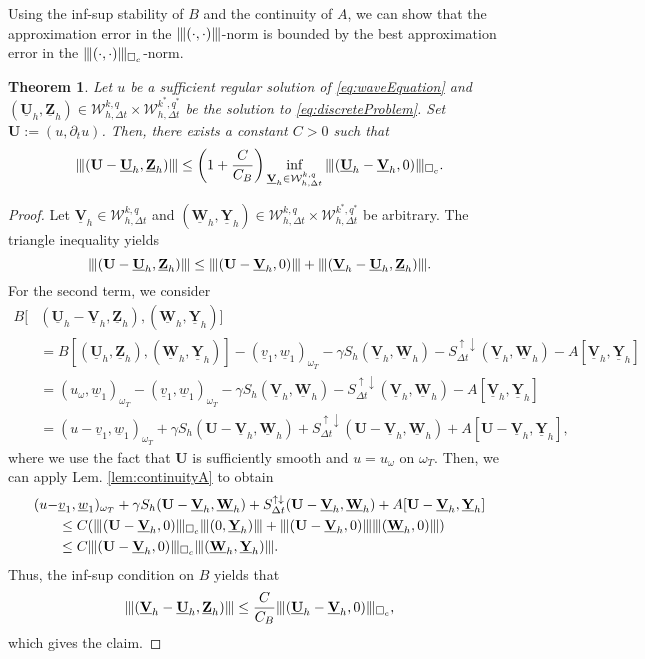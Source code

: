 \documentclass[sn-mathphys-num]{sn-jnl}
\newtheorem{thm}{Theorem}[section]
\numberwithin{equation}{section}
\newcommand{\wop}{\square_c}
\newcommand{\tnorm}[1]{\vert\hspace{-0.3mm}\Vert#1\Vert\hspace{-0.3mm}\vert}
\newcommand{\ProdFullyDiscrSpace}[2]{ \mathcal{W}^{ {#1},{#2}}_{h, \Delta t  } }
\newcommand{\Uh}{\underline{\mathbf{U}}_h}
\newcommand{\Vh}{\underline{\mathbf{V}}_h}
\newcommand{\Yh}{\underline{\mathbf{Y}}_h}
\newcommand{\Zh}{\underline{\mathbf{Z}}_h}
\newcommand{\Wh}{\underline{\mathbf{W}}_h}
\newcommand{\Sud}{S^{\uparrow \downarrow}_{\Delta t}}
\begin{document}
\noindent Using the inf-sup stability of $B$ and the continuity of $A$, we can show that the approximation error in the $\tnorm{(\cdot,\cdot)}$-norm is bounded by the best approximation error in the $\tnorm{(\cdot,\cdot)}_{\wop}$-norm.

\begin{thm}\label{thm:bestapprox}
    Let $u$ be a sufficient regular solution of \eqref{eq:waveEquation} and $(\Uh,\Zh) \in \ProdFullyDiscrSpace{k}{q} \times \ProdFullyDiscrSpace{k^\ast}{q^\ast}$ be the solution to \eqref{eq:discreteProblem}. Set $\mathbf{U} := (u,\partial_t u)$. Then, there exists a constant $C>0$ such that
    \begin{equation}
        \tnorm{(\mathbf{U} - \Uh,\Zh)} \le \left( 1 + \frac{C}{C_B} \right) \inf_{\Vh \in \ProdFullyDiscrSpace{k}{q}} \tnorm{(\Uh - \Vh, 0)}_{\wop}.  
    \end{equation}
\end{thm}

\begin{proof}
    Let $\Vh \in \ProdFullyDiscrSpace{k}{q}$  and $(\Wh,\Yh) \in \ProdFullyDiscrSpace{k}{q} \times \ProdFullyDiscrSpace{k^\ast}{q^\ast}$ be arbitrary. The triangle inequality yields 
    \begin{equation*}
        \tnorm{(\mathbf{U} - \Uh,\Zh)} \le \tnorm{(\mathbf{U} - \Vh,0)} + \tnorm{(\Vh - \Uh,\Zh)}.
    \end{equation*}
    For the second term, we consider
    \begin{align*}
        B[&(\Uh - \Vh, \Zh),( \Wh, \Yh)] \\
        &= B[(\Uh,\Zh),( \Wh, \Yh)] - (\underline{v}_1, \underline{w}_1)_{\omega_T} - \gamma S_h(\Vh,\Wh) - \Sud(\Vh,\Wh) - A[\Vh,\Yh] \\
        &= (u_{\omega}, \underline{w}_1)_{\omega_T} - (\underline{v}_1, \underline{w}_1)_{\omega_T} - \gamma S_h(\Vh,\Wh) - \Sud(\Vh,\Wh) - A[\Vh,\Yh] \\
        &= (u - \underline{v}_1, \underline{w}_1)_{\omega_T}  + \gamma S_h(\mathbf{U} - \Vh,\Wh) + \Sud(\mathbf{U} - \Vh,\Wh) + A[\mathbf{U} - \Vh,\Yh],
    \end{align*} 
    where we use the fact that $\mathbf{U}$ is sufficiently smooth and $u = u_{\omega}$ on $\omega_T$. Then, we can apply Lem. \ref{lem:continuityA} to obtain 
    \begin{align*}
        (u - &\underline{v}_1, \underline{w}_1)_{\omega_T}  + \gamma S_h(\mathbf{U} - \Vh,\Wh) + \Sud(\mathbf{U} - \Vh,\Wh) + A[\mathbf{U} - \Vh,\Yh] \\
        &\le C(\tnorm{(\mathbf{U} - \Vh,0)}_{\wop} \tnorm{(0,\Yh)}  + \tnorm{(\mathbf{U} - \Vh,0)} \tnorm{(\Wh,0)} ) \\
        &\le C \tnorm{(\mathbf{U} - \Vh,0)}_{\wop} \tnorm{(\Wh,\Yh)}.
    \end{align*}
    Thus, the inf-sup condition on $B$ yields that 
    \begin{equation*}
        \tnorm{(\Vh - \Uh,\Zh)} \le \frac{C}{C_B} \tnorm{(\Uh - \Vh, 0)}_{\wop},
    \end{equation*}
    which gives the claim. 
\end{proof}
\end{document}
